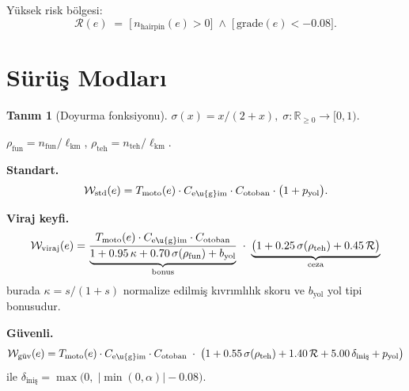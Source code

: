 \documentclass[11pt,a4paper]{article}
\newcommand{\WW}{\mathcal{W}}
\theoremstyle{definition}
\newtheorem{definition}{Tan{\i}m}[section]
\begin{document}
\noindent Y\"uksek risk b\"olgesi:
\begin{equation}\label{eq:highrisk}
  \mathcal{R}(e)
  \;=\;
  \bigl[\,n_{\text{hairpin}}(e)>0\bigr]
  \;\wedge\;
  \bigl[\,\text{grade}(e) < -0.08\bigr].
\end{equation}

\section{S\"ur\"u\c{s} Modlar{\i}}\label{sec:modes}

\begin{definition}[Doyurma fonksiyonu]\label{def:sat}
$\sigma(x) = x/(2+x),\;\sigma:\mathbb{R}_{\ge 0}\to [0,1).$
\end{definition}

\noindent
$\rho_{\text{fun}}=n_{\text{fun}}/\ell_{\text{km}}$,\;
$\rho_{\text{teh}}=n_{\text{teh}}/\ell_{\text{km}}$.

\smallskip\noindent\textbf{Standart.}
\begin{equation}\label{eq:standart}
  \WW_{\text{std}}(e) = T_{\mathrm{moto}}(e)
    \cdot C_{\mathrm{e\u{g}im}}
    \cdot C_{\mathrm{otoban}}
    \cdot \bigl(1 + p_{\text{yol}}\bigr).
\end{equation}

\smallskip\noindent\textbf{Viraj keyfi.}
\begin{equation}\label{eq:viraj}
  \WW_{\text{viraj}}(e) =
    \frac{T_{\mathrm{moto}}(e)\cdot C_{\mathrm{e\u{g}im}}\cdot C_{\mathrm{otoban}}}
         {\underbrace{1 + 0.95\,\kappa + 0.70\,\sigma(\rho_{\text{fun}}) + b_{\text{yol}}}_\text{bonus}}
    \;\cdot\;
    \underbrace{\bigl(1 + 0.25\,\sigma(\rho_{\text{teh}}) + 0.45\,\mathcal{R}\bigr)}_\text{ceza}
\end{equation}
burada $\kappa = s/(1+s)$ normalize edilmi\c{s} kıvrımlılık
skoru ve $b_{\text{yol}}$ yol tipi bonusudur.

\smallskip\noindent\textbf{G\"uvenli.}
\begin{equation}\label{eq:guvenli}
  \WW_{\text{g\"uv}}(e) =
    T_{\mathrm{moto}}(e)\cdot C_{\mathrm{e\u{g}im}}\cdot C_{\mathrm{otoban}}
    \;\cdot\;
    \bigl(1 + 0.55\,\sigma(\rho_{\text{teh}}) + 1.40\,\mathcal{R}
          + 5.00\,\delta_{\text{ini\c{s}}}
          + p_{\text{yol}}\bigr)
\end{equation}
ile $\delta_{\text{ini\c{s}}} = \max\bigl(0,\;|\min(0,\alpha)|-0.08\bigr)$.
\end{document}
